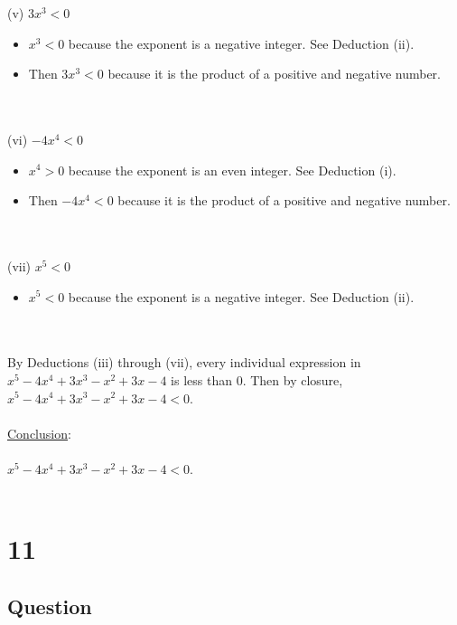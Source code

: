 \documentclass[12pt]{article}
\newcommand{\xlist}[1]{
    \begin{itemize}
        \renewcommand{\labelitemi}{$\centerdot$}
        #1
    \end{itemize}
    \newblock
    \\ \\
}
\newcommand{\xconclusion}[1]{
    \underline{Conclusion}:
    \\ \\
    #1
    \\ \\
}
\begin{document}
(v) $3x^3 < 0$
\xlist{
  \item $x^3 < 0$ because the exponent is a negative integer. See Deduction (ii).
  \item Then $3x^3 < 0$ because it is the product of a positive and negative number.
  
}
(vi) $-4x^4 < 0$
\xlist{
  \item $x^4 > 0$ because the exponent is an even integer. See Deduction (i).
  \item Then $-4x^4 < 0$ because it is the product of a positive and negative number.
}
(vii) $x^5 < 0$
\xlist{
  \item $x^5 < 0$ because the exponent is a negative integer. See Deduction (ii).
}
By Deductions (iii) through (vii), every individual expression in $x^5 - 4x^4 + 3x^3 - x^2 + 3x - 4$ is less than 0. 
Then by closure, $x^5 - 4x^4 + 3x^3 - x^2 + 3x - 4 < 0$. \\ \\
\xconclusion{$x^5 - 4x^4 + 3x^3 - x^2 + 3x - 4 < 0$.}

\section*{11}
\subsection*{Question}
\end{document}
